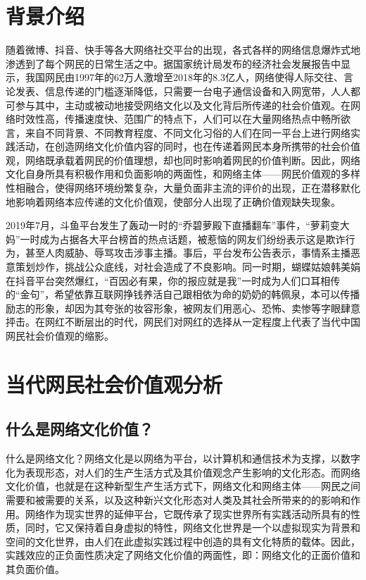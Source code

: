 \documentclass[UTF8]{ctexart}
\begin{document}
\section{背景介绍}
	随着微博、抖音、快手等各大网络社交平台的出现，各式各样的网络信息爆炸式地渗透到了每个网民的日常生活之中。据国家统计局发布的经济社会发展报告中显示，我国网民由1997年的62万人激增至2018年的8.3亿人，网络使得人际交往、言论发表、信息传递的门槛逐渐降低，只需要一台电子通信设备和入网宽带，人人都可参与其中，主动或被动地接受网络文化以及文化背后所传递的社会价值观。在网络时效性高，传播速度快、范围广的特点下，人们可以在大量网络热点中畅所欲言，来自不同背景、不同教育程度、不同文化习俗的人们在同一平台上进行网络实践活动，在创造网络文化价值内容的同时，也在传递着网民本身所携带的社会价值观，网络既承载着网民的价值理想，却也同时影响着网民的价值判断。因此，网络文化自身所具有积极作用和负面影响的两面性，和网络主体——网民价值观的多样性相融合，使得网络环境纷繁复杂，大量负面非主流的评价的出现，正在潜移默化地影响着网络本应传递的文化价值观，使部分人出现了正确价值观缺失现象\cite{LYX}。
	\par{2019年7月，斗鱼平台发生了轰动一时的“乔碧萝殿下直播翻车”事件，“萝莉变大妈”一时成为占据各大平台榜首的热点话题，被惹恼的网友们纷纷表示这是欺诈行为，甚至人肉威胁、辱骂攻击涉事主播。事后，平台发布公告表示，事情系主播恶意策划炒作，挑战公众底线，对社会造成了不良影响。同一时期，蝴蝶姑娘韩美娟在抖音平台突然爆红，“百因必有果，你的报应就是我”一时成为人们口耳相传的“金句”，希望依靠互联网挣钱养活自己跟相依为命的奶奶的韩佩泉，本可以传播励志的形象，却因为其夸张的妆容形象，被网友们用恶心、恐怖、卖惨等字眼肆意抨击。在网红不断层出的时代，网民们对网红的选择从一定程度上代表了当代中国网民社会价值观的缩影。}
\section{当代网民社会价值观分析}
	\subsection{什么是网络文化价值？}
	什么是网络文化？网络文化是以网络为平台，以计算机和通信技术为支撑，以数字化为表现形态，对人们的生产生活方式及其价值观念产生影响的文化形态\cite{WN}。而网络文化价值，也就是在这种新型生产生活方式下，网络文化和网络主体——网民之间需要和被需要的关系，以及这种新兴文化形态对人类及其社会所带来的的影响和作用。网络作为现实世界的延伸平台，它既传承了现实世界所有实践活动所具有的性质，同时，它又保持着自身虚拟的特性，网络文化世界是一个以虚拟现实为背景和空间的文化世界，由人们在此虚拟实践过程中创造的具有文化特质的载体。因此，实践效应的正负面性质决定了网络文化价值的两面性，即：网络文化的正面价值和其负面价值。
\end{document}
